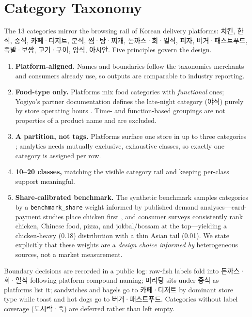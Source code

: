 \documentclass[10pt,twocolumn]{article}
\begin{document}
\section{Category Taxonomy}
\label{sec:taxonomy}

The 13 categories mirror the browsing rail of Korean delivery platforms:
치킨, 한식, 중식, 카페·디저트, 분식, 찜·탕·찌개, 돈까스·회·일식, 피자,
버거·패스트푸드, 족발·보쌈, 고기·구이, 양식, 아시안. Five principles
govern the design.

\begin{enumerate}
\item \textbf{Platform-aligned.} Names and boundaries follow the taxonomies
  merchants and consumers already use, so outputs are comparable to industry
  reporting.
\item \textbf{Food-type only.} Platforms mix food categories with
  \emph{functional} ones; Yogiyo's partner documentation defines the
  late-night category (야식) purely by store operating hours
  \cite{yogiyo}. Time- and function-based groupings are not properties of a
  product name and are excluded.
\item \textbf{A partition, not tags.} Platforms surface one store in up to
  three categories \cite{yogiyo}; analytics needs mutually exclusive,
  exhaustive classes, so exactly one category is assigned per row.
\item \textbf{10--20 classes,} matching the visible category rail and
  keeping per-class support meaningful.
\item \textbf{Share-calibrated benchmark.} The synthetic benchmark samples
  categories by a \texttt{benchmark\_share} weight informed by published
  demand analyses---card-payment studies place chicken first
  \cite{hana2022}, and consumer surveys consistently rank chicken, Chinese
  food, pizza, and jokbal/bossam at the top---yielding a chicken-heavy
  (0.18) distribution with a thin Asian tail (0.01). We state explicitly
  that these weights are a \emph{design choice informed by} heterogeneous
  sources, not a market measurement.
\end{enumerate}

Boundary decisions are recorded in a public log: raw-fish labels fold into
돈까스·회·일식 following platform compound naming; 마라탕 sits under 중식 as
platforms list it; sandwiches and bagels go to 카페·디저트 by dominant store
type while toast and hot dogs go to 버거·패스트푸드. Categories without
label coverage (도시락·죽) are deferred rather than left empty.
\end{document}
